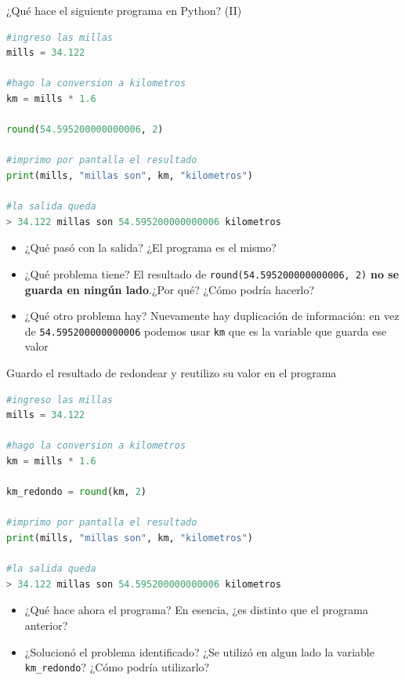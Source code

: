 \documentclass{beamer}
\begin{document}
\begin{frame}[fragile]{¿Qué hace el siguiente programa en Python? (II)}
\begin{lstlisting}[language=Python]
#ingreso las millas 
mills = 34.122

#hago la conversion a kilometros
km = mills * 1.6

round(54.595200000000006, 2)

#imprimo por pantalla el resultado
print(mills, "millas son", km, "kilometros")

#la salida queda 
> 34.122 millas son 54.595200000000006 kilometros
\end{lstlisting} \pause

\begin{itemize}
    \item ¿Qué pasó con la salida? \pause ¿El programa es el mismo? \pause
    \item ¿Qué problema tiene? \pause El resultado de \texttt{round(54.595200000000006, 2)} \textbf{no se guarda en ningún lado}.\pause  ¿Por qué? \pause ¿Cómo podría hacerlo?\pause 
    \item ¿Qué otro problema hay? \pause Nuevamente hay duplicación de información: en vez de \texttt{54.595200000000006} podemos usar \texttt{km} que es la variable que guarda ese valor
\end{itemize}
\end{frame}


\begin{frame}[fragile]{Guardo el resultado de redondear y reutilizo su valor en el programa}
\begin{lstlisting}[language=Python]
#ingreso las millas 
mills = 34.122

#hago la conversion a kilometros
km = mills * 1.6

km_redondo = round(km, 2)

#imprimo por pantalla el resultado
print(mills, "millas son", km, "kilometros")

#la salida queda 
> 34.122 millas son 54.595200000000006 kilometros
\end{lstlisting} \pause

\begin{itemize}
    \item ¿Qué hace ahora el programa? \pause En esencia, ¿es distinto que el programa anterior? \pause
    \item ¿Solucionó el problema identificado? \pause ¿Se utilizó en algun lado la variable \texttt{km\_redondo}? ¿Cómo podría utilizarlo? 
\end{itemize}
\end{frame}
\end{document}
